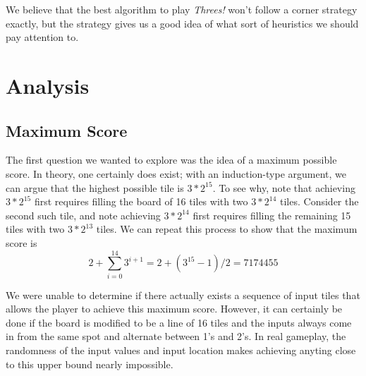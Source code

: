 \documentclass[11pt]{article}
\begin{document}
We believe that the best algorithm to play \emph{Threes!} won't follow a corner strategy exactly, but the strategy gives us a good idea of what sort of heuristics we should pay attention to.

\section{Analysis}

\subsection{Maximum Score}

The first question we wanted to explore was the idea of a maximum possible score. In theory, one certainly does exist; with an induction-type argument, we can argue that the highest possible tile is $3*2^{15}$. To see why, note that achieving $3*2^{15}$ first requires filling the board of 16 tiles with two $3*2^{14}$ tiles. Consider the second such tile, and note achieving $3*2^{14}$ first requires filling the remaining 15 tiles with two $3*2^{13}$ tiles. We can repeat this process to show that the maximum score is
\[ 2 + \sum_{i=0}^{14} 3^{i+1} = 2 + (3^{15}-1)/2 = 7174455 \]

We were unable to determine if there actually exists a sequence of input tiles that allows the player to achieve this maximum score. However, it can certainly be done if the board is modified to be a line of 16 tiles and the inputs always come in from the same spot and alternate between 1's and 2's. In real gameplay, the randomness of the input values and input location makes achieving anyting close to this upper bound nearly impossible.
\end{document}
